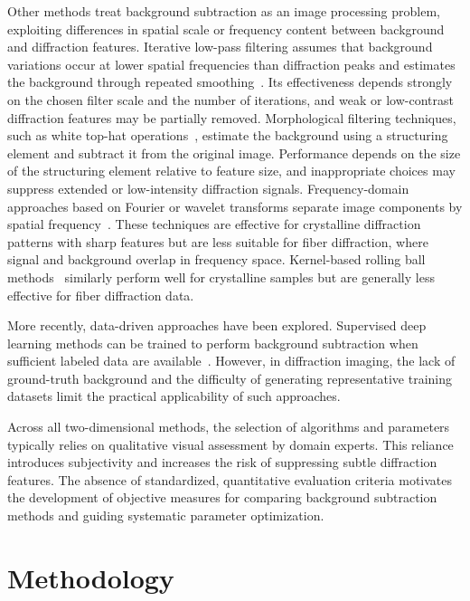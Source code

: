 \documentclass[iucr,review]{iucrjournals}
\begin{document}
Other methods treat background subtraction as an image processing problem, exploiting differences in spatial scale or frequency content between background and diffraction features. Iterative low-pass filtering assumes that background variations occur at lower spatial frequencies than diffraction peaks and estimates the background through repeated smoothing~\cite{IvanovaMakowski1998}. Its effectiveness depends strongly on the chosen filter scale and the number of iterations, and weak or low-contrast diffraction features may be partially removed. Morphological filtering techniques, such as white top-hat operations~\cite{GonzalezWoodsDIP4e}, estimate the background using a structuring element and subtract it from the original image. Performance depends on the size of the structuring element relative to feature size, and inappropriate choices may suppress extended or low-intensity diffraction signals. Frequency-domain approaches based on Fourier or wavelet transforms separate image components by spatial frequency~\cite{PolarBackground2024, WaveletBiomedOptExpress2021}. These techniques are effective for crystalline diffraction patterns with sharp features but are less suitable for fiber diffraction, where signal and background overlap in frequency space. Kernel-based rolling ball methods~\cite{Sternberg1983} similarly perform well for crystalline samples but are generally less effective for fiber diffraction data.

More recently, data-driven approaches have been explored. Supervised deep learning methods can be trained to perform background subtraction when sufficient labeled data are available~\cite{ArangurenCarmona2020}. However, in diffraction imaging, the lack of ground-truth background and the difficulty of generating representative training datasets limit the practical applicability of such approaches.

Across all two-dimensional methods, the selection of algorithms and parameters typically relies on qualitative visual assessment by domain experts. This reliance introduces subjectivity and increases the risk of suppressing subtle diffraction features. The absence of standardized, quantitative evaluation criteria motivates the development of objective measures for comparing background subtraction methods and guiding systematic parameter optimization.




\section{Methodology}
\end{document}
